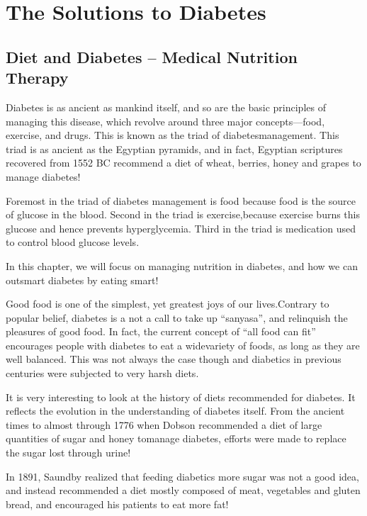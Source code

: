 
\part{The Solutions to Diabetes}

\chapter{Diet and Diabetes – Medical Nutrition Therapy}\label{chap22}

Diabetes is as ancient as mankind itself, and so are the basic principles of managing this disease, which revolve around three major concepts—food, exercise, and drugs. This is known as the triad of diabetes\break management. This triad is as ancient as the Egyptian pyramids, and in fact, Egyptian scriptures recovered from 1552 BC recommend a diet of wheat, berries, honey and grapes to manage diabetes!

Foremost in the triad of diabetes management is food because food is the source of glucose in the blood. Second in the triad is exercise,\break because exercise burns this glucose and hence prevents hyperglycemia. Third in the triad is medication used to control blood glucose levels.

In this chapter, we will focus on managing nutrition in diabetes, and how we can outsmart diabetes by eating smart!

Good food is one of the simplest, yet greatest joys of our lives.\break Contrary to popular belief, diabetes is a not a call to take up “sanyasa”, and relinquish the pleasures of good food. In fact, the current concept of “all food can fit” encourages people with diabetes to eat a wide\break variety of foods, as long as they are well balanced. This was not always the case though and diabetics in previous centuries were subjected to very harsh diets.


It is very interesting to look at the history of diets recommended for diabetes. It reflects the evolution in the understanding of diabetes itself. From the ancient times to almost through 1776 when Dobson recommended a diet of large quantities of sugar and honey to\break manage diabetes, efforts were made to replace the sugar lost through urine!

In 1891, Saundby realized that feeding diabetics more sugar was not a good idea, and instead recommended a diet mostly composed of meat, vegetables and gluten bread, and encouraged his patients to eat more fat!


